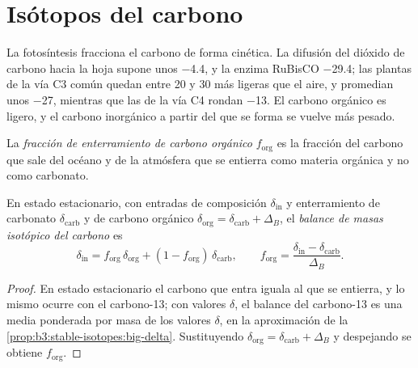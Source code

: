 \section{Isótopos del carbono}\label{sec:b3:stable-isotopes:carbon}

La fotosíntesis fracciona el carbono de forma cinética. La difusión del
dióxido de carbono hacia la hoja supone unos \qty{-4.4}{\permil}, y la enzima RuBisCO
\qty{-29.4}{\permil}; las plantas de la vía C3 común quedan entre \num{20} y
\qty{30}{\permil} más ligeras que el aire, y promedian unos
\qty{-27}{\permil}, mientras que las de la vía C4 rondan \qty{-13}{\permil}. El carbono orgánico
es ligero, y el carbono inorgánico a partir del que se forma se vuelve más pesado.

\begin{definition}\label{def:b3:stable-isotopes:forg}
La \emph{fracción de enterramiento de carbono orgánico}
$f_{\mathrm{org}}$ es la fracción del carbono que sale del océano y
de la atmósfera que se entierra como materia orgánica y no como carbonato.
\end{definition}

\begin{proposition}\label{prop:b3:stable-isotopes:forg}
En estado estacionario, con entradas de composición $\delta_{\mathrm{in}}$ y enterramiento de
carbonato $\delta_{\mathrm{carb}}$ y de carbono orgánico $\delta_{\mathrm{org}} =
\delta_{\mathrm{carb}} + \Delta_B$, el \emph{balance de masas isotópico del
carbono} es
\[
\delta_{\mathrm{in}} = f_{\mathrm{org}}\,\delta_{\mathrm{org}} + (1 - f_{\mathrm{org}})\,
\delta_{\mathrm{carb}}, \qquad f_{\mathrm{org}} = \frac{\delta_{\mathrm{in}} -
\delta_{\mathrm{carb}}}{\Delta_B}.
\]
\end{proposition}

\begin{proof}
En estado estacionario el carbono que entra iguala al que se entierra, y lo mismo
ocurre con el carbono-13; con valores $\delta$, el balance del carbono-13 es una media
ponderada por masa de los valores $\delta$, en la aproximación de
la \cref{prop:b3:stable-isotopes:big-delta}. Sustituyendo $\delta_{\mathrm{org}} =
\delta_{\mathrm{carb}} + \Delta_B$ y despejando se obtiene $f_{\mathrm{org}}$.
\end{proof}

